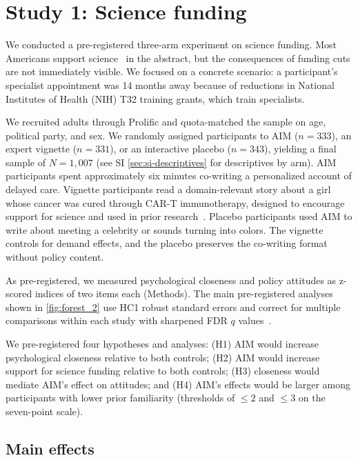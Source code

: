 \documentclass[11pt]{article}
\begin{document}
\section{Study 1: Science funding}
\label{sec:study-1-science-funding}
\label{sec:aim_experiment}

We conducted a pre-registered three-arm experiment on science funding. Most Americans support science~\cite{kennedy_americans_2026} in the abstract, but the consequences of funding cuts are not immediately visible. We focused on a concrete scenario: a participant's specialist appointment was 14 months away because of reductions in National Institutes of Health (NIH) T32 training grants, which train specialists.

We recruited adults through Prolific and quota-matched the sample on age, political party, and sex. We randomly assigned participants to AIM ($n=333$), an expert vignette ($n=331$), or an interactive placebo ($n=343$), yielding a final sample of $N=1{,}007$ (see SI \autoref{sec:si-descriptives} for descriptives by arm). AIM participants spent approximately six minutes co-writing a personalized account of delayed care. Vignette participants read a domain-relevant story about a girl whose cancer was cured through CAR-T immunotherapy, designed to encourage support for science and used in prior research~\cite{ophir_effects_2021}. Placebo participants used AIM to write about meeting a celebrity or sounds turning into colors. The vignette controls for demand effects, and the placebo preserves the co-writing format without policy content.

As pre-registered, we measured psychological closeness and policy attitudes as z-scored indices of two items each (Methods). The main pre-registered analyses shown in \autoref{fig:forest_2} use HC1 robust standard errors and correct for multiple comparisons within each study with sharpened FDR $q$ values~\cite{anderson_multiple_2008}.

We pre-registered four hypotheses and analyses: (H1) AIM would increase psychological closeness relative to both controls; (H2) AIM would increase support for science funding relative to both controls; (H3) closeness would mediate AIM's effect on attitudes; and (H4) AIM's effects would be larger among participants with lower prior familiarity (thresholds of $\leq 2$ and $\leq 3$ on the seven-point scale).




\subsection{Main effects}
\label{sec:study-1-science-funding-main-effects}
\end{document}
